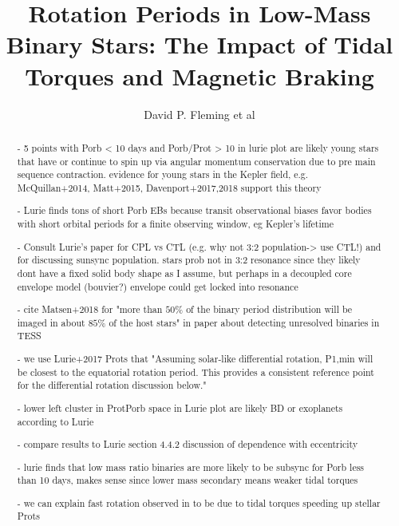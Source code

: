 \documentclass[twocolumn]{aastex61}
\begin{document}
\title{Rotation Periods in Low-Mass Binary Stars: The Impact of Tidal Torques and Magnetic Braking}



\author{David P. Fleming et al}


\begin{abstract}

- 5 points with Porb < 10 days and Porb/Prot > 10 in lurie plot are likely young stars that have or continue to spin up via angular momentum conservation due to pre main sequence contraction.  evidence for young stars in the Kepler field, e.g. McQuillan+2014, Matt+2015, Davenport+2017,2018 support this theory

- Lurie finds tons of short Porb EBs because transit observational biases favor bodies with short orbital periods for a finite observing window, eg Kepler's lifetime 

- Consult Lurie's paper for CPL vs CTL (e.g. why not 3:2 population-> use CTL!) and for discussing sunsync population. stars prob not in 3:2 resonance since they likely dont have a fixed solid body shape as I assume, but perhaps in a decoupled core envelope model (bouvier?) envelope could get locked into resonance

- cite Matsen+2018 for "more than $50\%$ of the binary period distribution will be imaged in about $85\%$ of the host stars" in paper
about detecting unresolved binaries in TESS

- we use Lurie+2017 Prots that "Assuming solar-like differential rotation, P1,min will be closest to the equatorial rotation period. This provides a consistent reference point for the differential rotation discussion below."

- lower left cluster in ProtPorb space in Lurie plot are likely BD or exoplanets according to Lurie

- compare results to Lurie section 4.4.2 discussion of dependence with eccentricity

- lurie finds that low mass ratio binaries are more likely to be subsync for Porb less than 10 days, makes sense since lower mass secondary means weaker tidal torques

- we can explain fast rotation observed in \citet{Meibom2007} to be due to tidal torques speeding up stellar Prots

\end{abstract}
\end{document}
